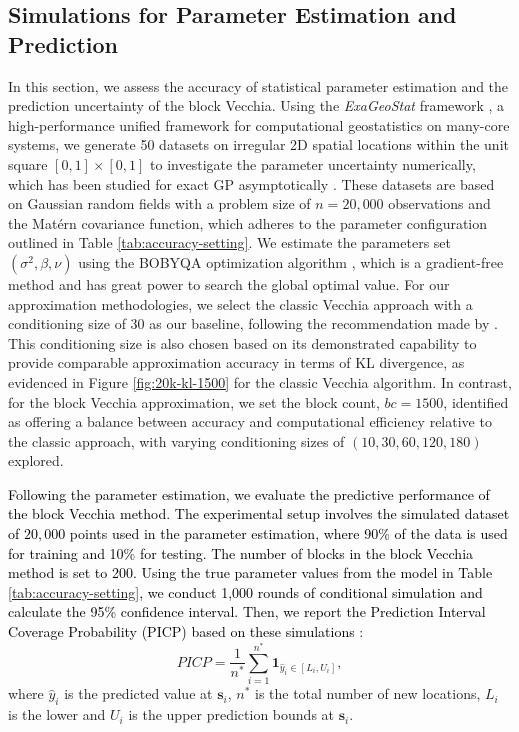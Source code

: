 \documentclass[12pt]{article}
\begin{document}
\subsection{Simulations for Parameter Estimation and Prediction}

In this section, we assess the accuracy of statistical parameter estimation and the prediction uncertainty of the block Vecchia.  Using the \textit{ExaGeoStat} framework \citep{abdulah2018exageostat}, a high-performance unified framework for computational geostatistics on many-core systems, we generate 50 datasets on irregular 2D spatial locations within the unit square $[0,1] \times [0,1]$ to investigate the parameter uncertainty numerically, which has been studied for exact GP asymptotically \citep{wang2023parameterization}. These datasets are based on Gaussian random fields with a problem size of $n=20,000$ observations and the Matérn covariance function, which adheres to the parameter configuration outlined in Table \ref{tab:accuracy-setting}. We estimate the parameters set $(\sigma^2, \beta, \nu)$ using the BOBYQA optimization algorithm \citep{powell2009bobyqa}, which is a gradient-free method and has great power to search the global optimal value. For our approximation methodologies, we select the classic Vecchia approach with a conditioning size of 30 as our baseline, following the recommendation made by \citep{guinness2018permutation, pan2024gpuaccelerated}. This conditioning size is also chosen based on its demonstrated capability to provide comparable approximation accuracy in terms of KL divergence, as evidenced in Figure \ref{fig:20k-kl-1500} for the classic Vecchia algorithm. In contrast, for the block Vecchia approximation, we set the block count, $bc=1500$, identified as offering a balance between accuracy and computational efficiency relative to the classic approach, with varying conditioning sizes of $(10, 30, 60, 120, 180)$ explored.  

\textcolor{black}{
Following the parameter estimation, we  evaluate the predictive performance of the block Vecchia method. The experimental setup involves the simulated dataset of $20,000$ points used in the parameter estimation, where 90\% of the data is used for training and 10\% for testing. The number of blocks in the block Vecchia method is set to 200. Using the true parameter values from the model in Table \ref{tab:accuracy-setting}, we conduct 1,000 rounds of conditional simulation and calculate the 95\% confidence interval. Then, we report the Prediction Interval Coverage Probability (PICP) based on these simulations \citep{zhao2008statistical, nag2023bivariate}}:
\begin{equation}
    PICP = \frac{1}{n^*}\sum_{i=1}^{n^*} \boldsymbol{1}_{\hat y_{i} \in [L_i, U_i]},
\end{equation}
where $\hat y_i$ is the predicted value at $\bm s_i$, $n^*$ is the total number of new locations, $L_i$ is the lower and $U_i$ is the upper prediction bounds at $\bm s_i$. 
\end{document}
